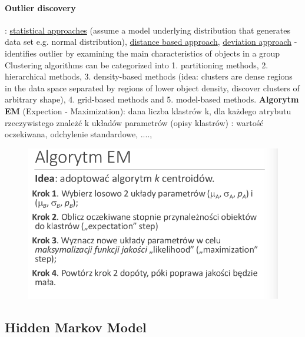 \documentclass[10pt,a4paper]{article}
\begin{document}
  \paragraph{Outlier discovery} : \underline{statistical approaches} (assume a model underlying distribution that generates data set e.g. normal distribution), \underline{distance based approach}, \underline{deviation approach} - identifies outlier by examining the main characteristics of objects in a group \\
  Clustering algorithms can be categorized into 1. partitioning methods, 2. hierarchical methods, 3. density-based methods (idea: clusters are dense regions in the data space separated by regions of lower object density, discover clusters of arbitrary shape), 4. grid-based methods and 5. model-based methods.
  \textbf{Algorytm EM} (Expection - Maximization): dana liczba klastrów k, dla każdego atrybutu rzeczywistego znależć k układów parametrów (opisy klastrów) : wartość oczekiwana, odchylenie standardowe, ....,
  \begin{figure}[H]
    \centering
      \includegraphics[scale=0.50]{images/algEM.png}
  \end{figure}
\subsection{Hidden Markov Model}
\end{document}
